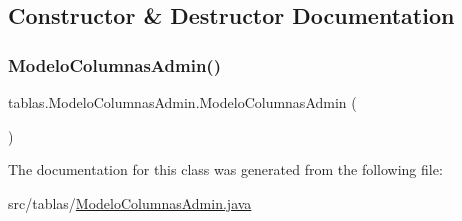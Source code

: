 \subsection{Constructor \& Destructor Documentation}
\mbox{\label{classtablas_1_1_modelo_columnas_admin_a3eb7695156d3ba6516381929e474ec82}} 
\subsubsection{\texorpdfstring{Modelo\+Columnas\+Admin()}{ModeloColumnasAdmin()}}
{\footnotesize\ttfamily tablas.\+Modelo\+Columnas\+Admin.\+Modelo\+Columnas\+Admin (\begin{DoxyParamCaption}{ }\end{DoxyParamCaption})}



The documentation for this class was generated from the following file\+:\begin{DoxyCompactItemize}
\item 
src/tablas/\mbox{\hyperlink{_modelo_columnas_admin_8java}{Modelo\+Columnas\+Admin.\+java}}\end{DoxyCompactItemize}
